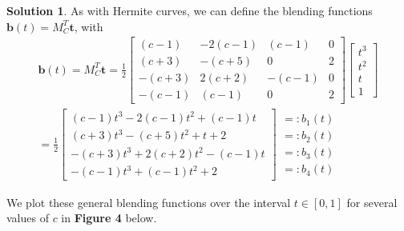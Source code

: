 \documentclass[10pt]{article}
\theoremstyle{plain}
\theoremstyle{definition}
\newtheorem*{soln*}{Solution}
\numberwithin{equation}{section}
\begin{document}
\begin{soln*}
    As with Hermite curves, we can define the blending functions
    $\bm{b}(t) = M_C^T \bm{t}$, with
    \begin{align*}
    \bm{b}(t) = M_C^T \bm{t}
              = 
            \frac{1}{2} \begin{bmatrix}
                (c-1)   & -2(c-1)   & (c-1)     & 0         \\
                (c+3)   & -(c+5)    & 0         & 2         \\
                -(c+3)  & 2(c+2)    & -(c-1)    & 0         \\
                -(c-1)  & (c-1)     & 0         & 2
            \end{bmatrix}
    \begin{bmatrix} t^3 \\ t^2 \\ t \\ 1 \end{bmatrix} \\
          =  \frac{1}{2} \begin{bmatrix}
              (c-1)   t^3 -2(c-1) t^2  + (c-1)  t \\ 
              (c+3)   t^3 -(c+5)  t^2    +     t   + 2         \\
              -(c+3)  t^3 + 2(c+2)  t^2  -(c-1) t  \\ 
              -(c-1)  t^3 + (c-1)   t^2  + 2
            \end{bmatrix}
            \begin{matrix}
                =: b_1(t) \\
                =: b_2(t) \\
                =: b_3(t) \\
                =: b_4(t) 
            \end{matrix}
    \end{align*}

    We plot these general blending functions over the interval $t\in[0,1]$ for several values
    of $c$ in \textbf{Figure 4} below.
\end{soln*}
\hrulefill
\end{document}
